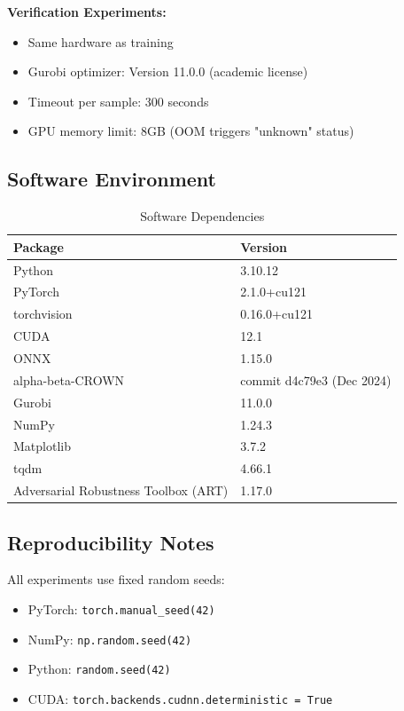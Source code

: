 \documentclass[11pt,a4paper]{article}
\begin{document}
\textbf{Verification Experiments:}
\begin{itemize}
    \item Same hardware as training
    \item Gurobi optimizer: Version 11.0.0 (academic license)
    \item Timeout per sample: 300 seconds
    \item GPU memory limit: 8GB (OOM triggers "unknown" status)
\end{itemize}

\subsection{Software Environment}

\begin{table}[H]
\centering
\begin{tabular}{ll}
\toprule
\textbf{Package} & \textbf{Version} \\
\midrule
Python & 3.10.12 \\
PyTorch & 2.1.0+cu121 \\
torchvision & 0.16.0+cu121 \\
CUDA & 12.1 \\
ONNX & 1.15.0 \\
alpha-beta-CROWN & commit d4c79e3 (Dec 2024) \\
Gurobi & 11.0.0 \\
NumPy & 1.24.3 \\
Matplotlib & 3.7.2 \\
tqdm & 4.66.1 \\
Adversarial Robustness Toolbox (ART) & 1.17.0 \\
\bottomrule
\end{tabular}
\caption{Software Dependencies}
\end{table}

\subsection{Reproducibility Notes}

All experiments use fixed random seeds:
\begin{itemize}
    \item PyTorch: \texttt{torch.manual\_seed(42)}
    \item NumPy: \texttt{np.random.seed(42)}
    \item Python: \texttt{random.seed(42)}
    \item CUDA: \texttt{torch.backends.cudnn.deterministic = True}
\end{itemize}
\end{document}
